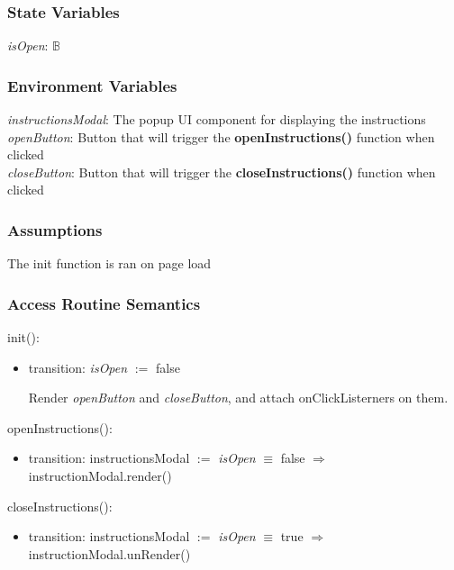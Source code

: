 \documentclass[12pt, titlepage]{article}
\begin{document}
	\subsubsection{State Variables}
	
	\textit{isOpen}: $\mathbb{B}$
	
	\subsubsection{Environment Variables}
	
	\textit{instructionsModal}: The popup UI component for displaying the instructions\\
	
	\noindent \textit{openButton}: Button that will trigger the \textbf{openInstructions()} function when clicked\\
	
	\noindent \textit{closeButton}: Button that will trigger the \textbf{closeInstructions()} function when clicked
	
	\subsubsection{Assumptions}
	
	The init function is ran on page load
	
	\subsubsection{Access Routine Semantics}
	
	\noindent init():
	\begin{itemize}
		\item transition: \textit{isOpen} $:=$ false
		
		\noindent Render \textit{openButton} and \textit{closeButton}, and attach onClickListerners on them. 
	\end{itemize}
	
	\noindent openInstructions():
	\begin{itemize}
		\item transition: instructionsModal $:=$ \textit{isOpen} $\equiv$ false $\Rightarrow$ instructionModal.render()
	\end{itemize}
	
	\noindent closeInstructions():
	\begin{itemize}
		\item transition: instructionsModal $:=$ \textit{isOpen} $\equiv$ true $\Rightarrow$ instructionModal.unRender()
	\end{itemize}
	
\end{document}

